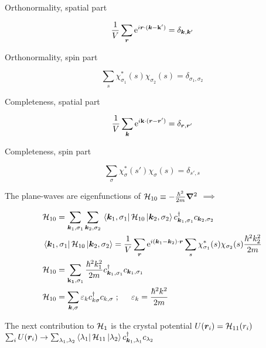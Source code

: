 \noindent Orthonormality, spatial part

\begin{equation}
	\frac{1}{V} \sum_{\bm{r}} \mathrm{e}^{i \bm{r}\cdot (\bm{k}-\vb{k}')} = \delta_{\bm{k}, \bm{k}'}
\end{equation}

\noindent Orthonormality, spin part

\begin{equation}
	\sum_s \chi_{\sigma_1}^* (s) \chi_{\sigma_2} (s) = \delta_{\sigma_1,\sigma_2}
\end{equation}

\noindent Completeness, spatial part

\begin{equation}
\frac{1}{V} \sum_{\bm{k}} \mathrm{e}^{i \vb{k}\cdot (\bm{r}-\bm{r}')} = \delta_{\bm{r}, \bm{r}'}
\end{equation}

\noindent Completeness, spin part

\begin{equation}
\sum_{\sigma} \chi_{\sigma}^* (s') \chi_{\sigma} (s) = \delta_{s',s}
\end{equation}

\noindent The plane-waves are eigenfunctions of $\mathcal{H}_{10} \equiv -\frac{\hbar^2}{2m} \grad^2$ $\implies$

\begin{align}
	& \mathcal{H}_{10} = \sum_{\bm{k}_1, \sigma_1} \sum_{\bm{k}_2, \sigma_2} \bra*{\bm{k}_1, \sigma_1} \mathcal{H}_{10} \ket*{\bm{k}_2, \sigma_2} c^{\dagger}_{ \bm{k}_1, \sigma_1} c_{\bm{k}_2, \sigma_2}\\
	&  \bra*{\bm{k}_1, \sigma_1} \mathcal{H}_{10} \ket*{\bm{k}_2, \sigma_2}  = \frac{1}{V} \sum_{\bm{r}} \mathrm{e}^{i (\bm{k}_1-\bm{k}_2)\cdot \bm{r}}  \sum_s \chi_{\sigma_1}^*(s) \chi_{\sigma_2}(s) \frac{\hbar^2 k_2^2}{2m}\\
	& \mathcal{H}_{10}= \sum_{\vb{k_1}, \sigma_1} \frac{\hbar^2 k_1^2}{2m} c^{\dagger}_{ \bm{k}_1, \sigma_1} c_{ \bm{k}_1, \sigma_1} \nonumber\\ 
	& \mathcal{H}_{10}= \sum_{\bm{k}, \sigma} \varepsilon_k c^{\dagger}_{k \sigma} c_{ k, \sigma} \hspace{0.1cm} ; \hspace{0.5cm} \varepsilon_k = \frac{\hbar^2 k^2}{2m} \nonumber
\end{align}

\noindent The next contribution to $\mathcal{H}_1$ is the crystal potential $U(\bm{r}_i)= \mathcal{H}_{11}(r_i)$\\
$ \sum_i U(\bm{r}_i) \rightarrow \sum_{\lambda_{1}, \lambda_{2}} \bra{\lambda_{1}}\mathcal{H}_{11} \ket{\lambda_{2}} c^{\dagger}_{ \bm{k}_1, \lambda_1} c_{\lambda_{2}}$

